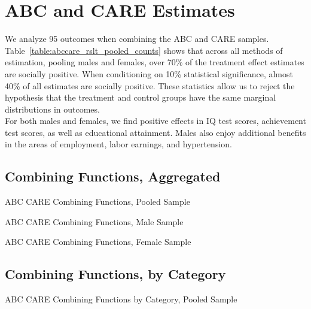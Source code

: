 \section{ABC and CARE Estimates}

\noindent We analyze 95 outcomes when combining the ABC and CARE samples. Table~\ref{table:abccare_rslt_pooled_counts} shows that across all methods of estimation, pooling males and females, over 70\% of the treatment effect estimates are socially positive. When conditioning on 10\% statistical significance, almost 40\% of all estimates are socially positive. These statistics allow us to reject the hypothesis that the treatment and control groups have the same marginal distributions in outcomes. \\

\noindent For both males and females, we find positive effects in IQ test scores, achievement test scores, as well as educational attainment. Males also enjoy additional benefits in the areas of employment, labor earnings, and hypertension. \\

\def\arraystretch{0.6}

\setlength\tabcolsep{0.3em}

\subsection{{Combining Functions, Aggregated}}


	\begin{table}[H]
     \caption{ABC CARE Combining Functions, Pooled Sample} 
     \label{table:abccare_rslt_pooled_counts}
	
	\end{table}  

	\begin{table}[H]
     \caption{ABC CARE Combining Functions, Male Sample} 
	
	\end{table}  

	\begin{table}[H]
     \caption{ABC CARE Combining Functions, Female Sample} 
	
	\end{table}  
\clearpage

\subsection{{Combining Functions, by Category}}


	\begin{table}[H]
     \caption{ABC CARE Combining Functions by Category, Pooled Sample} 
	
	\end{table}   

